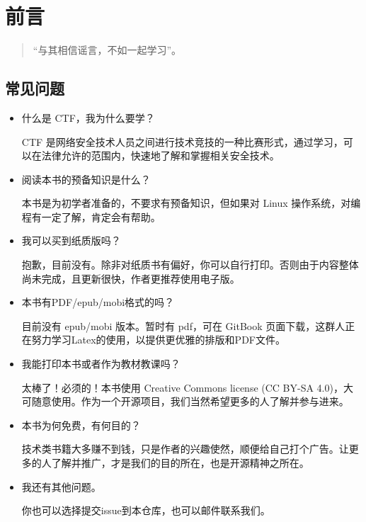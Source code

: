 \chapter{前言}

\begin{quote}
    “与其相信谣言，不如一起学习”。
\end{quote}

\section{常见问题}

\begin{itemize}\setlength{\parindent}{2em}
    \item 什么是 CTF，我为什么要学？
    
    CTF 是网络安全技术人员之间进行技术竞技的一种比赛形式，通过学习，可以在法律允许的范围内，快速地了解和掌握相关安全技术。

    \item 阅读本书的预备知识是什么？
    
    本书是为初学者准备的，不要求有预备知识，但如果对 Linux 操作系统，对编程有一定了解，肯定会有帮助。

    \item 我可以买到纸质版吗？
    
    抱歉，目前没有。除非对纸质书有偏好，你可以自行打印。否则由于内容整体尚未完成，且更新很快，作者更推荐使用电子版。
    
    \item 本书有PDF/epub/mobi格式的吗？
    
    目前没有 epub/mobi 版本。暂时有 pdf，可在 GitBook 页面下载，这群人正在努力学习Latex的使用，以提供更优雅的排版和PDF文件。
    
    \item 我能打印本书或者作为教材教课吗？
    
    太棒了！必须的！本书使用 Creative Commons license (CC BY-SA 4.0)，大可随意使用。作为一个开源项目，我们当然希望更多的人了解并参与进来。
    
    \item 本书为何免费，有何目的？
    
    技术类书籍大多赚不到钱，只是作者的兴趣使然，顺便给自己打个广告。让更多的人了解并推广，才是我们的目的所在，也是开源精神之所在。
    
    \item 我还有其他问题。
    
    你也可以选择提交issue到本仓库，也可以邮件联系我们。
    
\end{itemize}

